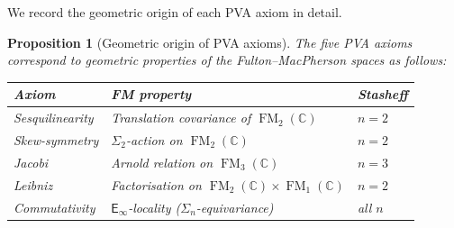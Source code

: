 \documentclass[11pt,reqno]{amsart}
\newtheorem{proposition}[theorem]{Proposition}
\theoremstyle{definition}
\theoremstyle{remark}
\newcommand{\CC}{\mathbb{C}}
\newcommand{\Einf}{\mathsf{E}_{\infty}}
\DeclareMathOperator{\FM}{FM}
\numberwithin{equation}{section}
\providecommand{\ClaimStatusProvedHere}{}
\begin{document}
We record the geometric origin of each PVA axiom in detail.

\begin{proposition}[Geometric origin of PVA axioms]
\label{prop:pva-axioms-geometry}
\ClaimStatusProvedHere{}
The five PVA axioms correspond to geometric properties of the
Fulton--MacPherson spaces as follows:
\begin{center}
\renewcommand{\arraystretch}{1.3}
\begin{tabular}{lll}
  \toprule
  \textbf{Axiom} & \textbf{FM property}
  & \textbf{Stasheff} \\
  \midrule
  Sesquilinearity & Translation covariance of $\FM_2(\CC)$
  & $n = 2$ \\
  Skew-symmetry & $\Sigma_2$-action on $\FM_2(\CC)$
  & $n = 2$ \\
  Jacobi & Arnold relation on $\FM_3(\CC)$
  & $n = 3$ \\
  Leibniz & Factorisation on $\FM_2(\CC) \times \FM_1(\CC)$
  & $n = 2$ \\
  Commutativity & $\Einf$-locality ($\Sigma_n$-equivariance)
  & all $n$ \\
  \bottomrule
\end{tabular}
\end{center}
\end{proposition}
\end{document}
